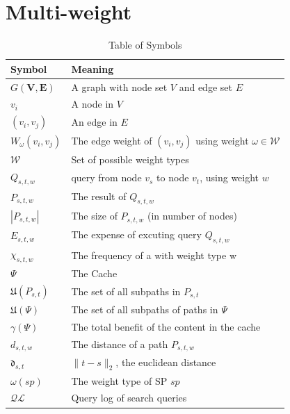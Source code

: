 \section{Multi-weight} \label{sec:intro}


\begin{table}
\begin{tabular*}{\columnwidth}{|l|p{}|}
\hline
\bf Symbol		& \bf Meaning \\\hline
$G\mathbf{(V,E)}$ 	& A graph with node set $V$ and edge set $E$ \\\hline 
$v_i$			& A node in $V$ \\\hline 
$(v_i,v_j)$		& An edge in $E$ \\\hline 
$W_\omega(v_i,v_j)$	& The edge weight of $(v_i,v_j)$ using weight $\omega \in \mathcal{W}$ \\\hline
$\mathcal{W}$		& Set of possible weight types \\\hline

$Q_{s,t,w}$		& \spath query from node $v_s$ to node $v_t$, using weight $w$\\\hline
$P_{s,t,w}$		& The \spath result of $Q_{s,t,w}$ \\\hline
$|P_{s,t,w}|$		& The size of $P_{s,t,w}$ (in number of nodes) \\\hline
$E_{s,t,w}$		& The expense of excuting query $Q_{s,t,w}$ \\\hline
$\chi_{s,t,w}$		& The frequency of a \spath with weight type w \\\hline
$\Psi$ 			& The Cache \\\hline
$\mathfrak{U}(P_{s,t})$	& The set of all subpaths in $P_{s,t}$ \\\hline
$\mathfrak{U}(\Psi)$	& The set of all subpaths of paths in $\Psi$ \\\hline
$\gamma(\Psi)$		& The total benefit of the content in the cache \\\hline

$d_{s,t,w}$		& The \spath distance of a path $P_{s,t,w}$ \\\hline
$\mathfrak{d}_{s,t}$	& $\| t - s \|_2$, the euclidean distance \\\hline
$\omega(sp)$		& The weight type of SP $sp$ \\\hline

$\mathcal{QL}$		& Query log of search queries \\\hline
\end{tabular*}
\caption{Table of Symbols}
\label{tab:symbols}
\end{table}

